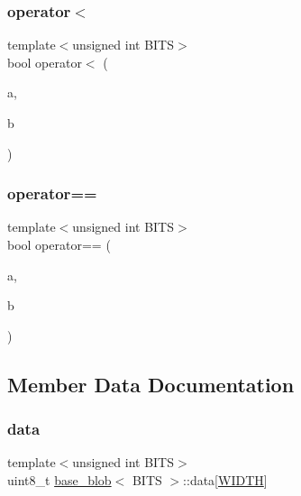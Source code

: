 \subsubsection{\texorpdfstring{operator$<$}{operator<}}
{\footnotesize\ttfamily template$<$unsigned int B\+I\+TS$>$ \\
bool operator$<$ (\begin{DoxyParamCaption}\item[{const \mbox{\hyperlink{classbase__blob}{base\+\_\+blob}}$<$ B\+I\+TS $>$ \&}]{a,  }\item[{const \mbox{\hyperlink{classbase__blob}{base\+\_\+blob}}$<$ B\+I\+TS $>$ \&}]{b }\end{DoxyParamCaption})\hspace{0.3cm}{\ttfamily [friend]}}

\mbox{\label{classbase__blob_abed369be2b14c869397bb2cccc066a13}} 
\subsubsection{\texorpdfstring{operator==}{operator==}}
{\footnotesize\ttfamily template$<$unsigned int B\+I\+TS$>$ \\
bool operator== (\begin{DoxyParamCaption}\item[{const \mbox{\hyperlink{classbase__blob}{base\+\_\+blob}}$<$ B\+I\+TS $>$ \&}]{a,  }\item[{const \mbox{\hyperlink{classbase__blob}{base\+\_\+blob}}$<$ B\+I\+TS $>$ \&}]{b }\end{DoxyParamCaption})\hspace{0.3cm}{\ttfamily [friend]}}



\subsection{Member Data Documentation}
\mbox{\label{classbase__blob_a667a178269121efb4ec95bd59e6a9615}} 
\subsubsection{\texorpdfstring{data}{data}}
{\footnotesize\ttfamily template$<$unsigned int B\+I\+TS$>$ \\
uint8\+\_\+t \mbox{\hyperlink{classbase__blob}{base\+\_\+blob}}$<$ B\+I\+TS $>$\+::data\mbox{[}\mbox{\hyperlink{classbase__blob_a712871e6425fe0509412c650c8a28262a3e53605ecb8eb4c497cb23476695f0c3}{W\+I\+D\+TH}}\mbox{]}\hspace{0.3cm}{\ttfamily [protected]}}



